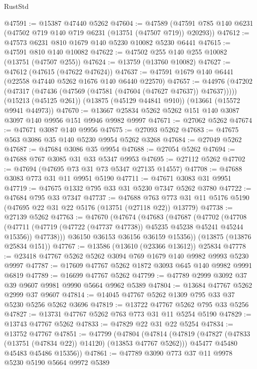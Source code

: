 \begin{lexlean}{RustStd}
\begin{coremodule}
@47591 := @15387 @47440 @5262
@47604 := @47589
    (@47591 @785 @140 @6231 (@47502 @719 @140 @719 @6231 (@13751 (@47507 @719)) @20293))
@47612 := @47573 @6231 @810 @1679 @140 @5230 @10082 @5230 @6441
@47615 := @47591 @810 @140 @10082
@47622 := @47502 @255 @140 @255 @10082 (@13751 (@47507 @255))
@47624 := @13759 (@13760 @10082)
@47627 := @47612 (@47615 (@47622 @47624))
@47637 := @47591 @1679 @140 @6441 (@22558 @47440 @5262 @1676 @140 @6440 @22570)
@47657 := @44976
    (@47202 (@47317 (@47436 (@47569 (@47581 (@47604 (@47627 @47637)) @47637)))))
    (@15213 (@45125 @261))
    (@13875 (@45129 @44841 @910))
    (@13661 (@15572 @9941 @44973))
@47670 := @13667 @25834 @5262 @5262 @151 @140 @3087 @3097 @140 @9956 @151 @9946 @9982 @9997
@47671 := @27062 @5262
@47674 := @47671 @3087 @140 @9956
@47675 := @27093 @5262
@47683 := @47675 @563 @3086 @35 @140 @5230 @9954 @5262 @3268
@47684 := @27049 @5262
@47687 := @47684 @3086 @35 @9954
@47688 := @27054 @5262
@47694 := @47688 @767 @3085 @31 @33 @5347 @9953
@47695 := @27112 @5262
@47702 := @47694 (@47695 @73 @31 @73 @5347 @27135 @14557)
@47708 := @47688 @3083 @773 @31 @11 @9951 @5190
@47711 := @47671 @3083 @31 @9951
@47719 := @47675 @1332 @795 @33 @31 @5230 @7347 @5262 @3780
@47722 := @47684 @795 @33 @7347
@47737 := @47688
    @763
    @773
    @31
    @11
    @5176
    @5190
    (@47695 @22 @31 @22 @5176 (@13751 (@27118 @22)) @13779)
@47738 := @27139 @5262
@47763 := @47670
    (@47674
      (@47683
        (@47687
          (@47702
            (@47708
              (@47711 (@47719 (@47722 (@47737 @47738)) @45235 @45238 @45241 @45244 @15356))
              @47738)))
        @36150
        @36153
        @36156
        @36159
        @15356))
    (@13875 (@13876 @25834 @151))
@47767 := @13586 (@13610 (@23366 @13612)) @25834
@47778 := @23418 @47767 @5262 @5262 @3094 @769 @1679 @140 @9982 @9993 @5230 @9997
@47787 := @17609 @47767 @5262 @1872 @3093 @645 @140 @9982 @9991 @6819
@47789 := @16699 @47767 @5262
@47799 := @47789 @2999 @3092 @37 @39 @9607 @9981 @9990 @5664 @9962 @5389
@47804 := @13684 @47767 @5262 @2999 @37 @9607
@47814 := @14045 @47767 @5262 @1309 @795 @33 @37 @5230 @5256 @5262 @3696
@47819 := @13722 @47767 @5262 @795 @33 @5256
@47827 := @13731 @47767 @5262 @763 @773 @31 @11 @5254 @5190
@47829 := @13743 @47767 @5262
@47833 := @47829 @22 @31 @22 @5254
@47834 := @13752 @47767
@47851 := @47799
    (@47804
      (@47814
        (@47819 (@47827 (@47833 (@13751 (@47834 @22)) @14120) (@13853 @47767 @5262)))
        @45477
        @45480
        @45483
        @45486
        @15356))
@47861 := @47789 @3090 @773 @37 @11 @9978 @5230 @5190 @5664 @9972 @5389

\end{coremodule}
\end{lexlean}
